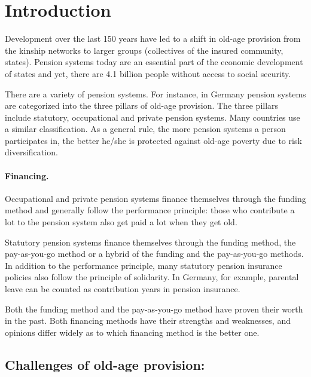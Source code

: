 \section{Introduction}

Development over the last 150 years have led to a shift in old-age provision from the kinship networks  to larger groups (collectives of the insured community, states). Pension systems today are an essential part of the economic development of states and yet, there are 4.1 billion people without access to social security.\cite{noauthor_universal_2017}

There are a variety of pension systems. For instance, in Germany pension systems are categorized into the three pillars of old-age provision. The three pillars include statutory, occupational and private pension systems. Many countries use a similar classification. As a general rule, the more pension systems a person participates in, the better he/she is protected against old-age poverty due to risk diversification.

\paragraph{Financing.} Occupational and private pension systems finance themselves through the funding method and generally follow the performance principle: those who contribute a lot to the pension system also get paid a lot when they get old.

Statutory pension systems finance themselves through the funding method, the pay-as-you-go method or a hybrid of the funding and the pay-as-you-go methods. In addition to the performance principle, many statutory pension insurance policies also follow the principle of solidarity. In Germany, for example, parental leave can be counted as contribution years in pension insurance.

Both the funding method and the pay-as-you-go method have proven their worth in the past. Both financing methods have their strengths and weaknesses, and opinions differ widely as to which financing method is the better one.

\subsection{Challenges of old-age provision:}


